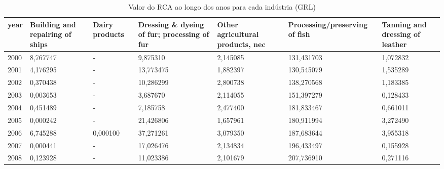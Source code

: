 \begin{table}
\centering
\caption{Valor do RCA ao longo dos anos para cada indústria (GRL)}
\begin{tabular}{p{1cm}p{2cm}p{2cm}p{2cm}p{2cm}p{2cm}p{2cm}}
\toprule
 year &  Building and repairing of ships &  Dairy products &  Dressing \& dyeing of fur; processing of fur &  Other agricultural products, nec &  Processing/preserving of fish &  Tanning and dressing of leather \\
\midrule
 2000 &                         8,767747 &               - &                                     9,875310 &                          2,145085 &                     131,431703 &                         1,072832 \\
 2001 &                         4,176295 &               - &                                    13,773475 &                          1,882397 &                     130,545079 &                         1,535289 \\
 2002 &                         0,370438 &               - &                                    10,286299 &                          2,800738 &                     138,270568 &                         1,183385 \\
 2003 &                         0,003653 &               - &                                     3,687670 &                          2,114055 &                     151,397279 &                         0,128433 \\
 2004 &                         0,451489 &               - &                                     7,185758 &                          2,477400 &                     181,833467 &                         0,661011 \\
 2005 &                         0,000242 &               - &                                    21,426806 &                          1,657961 &                     180,911994 &                         3,272490 \\
 2006 &                         6,745288 &        0,000100 &                                    37,271261 &                          3,079350 &                     187,683644 &                         3,955318 \\
 2007 &                         0,000441 &               - &                                    17,026476 &                          2,134834 &                     196,433497 &                         0,155928 \\
 2008 &                         0,123928 &               - &                                    11,023386 &                          2,101679 &                     207,736910 &                         0,271116 \\

\end{tabular}
\end{table}
